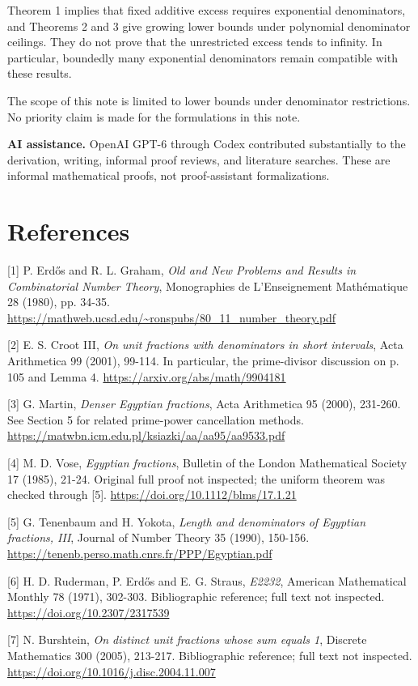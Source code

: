 \documentclass[11pt]{article}
\begin{document}
Theorem 1 implies that fixed additive excess requires exponential denominators, and Theorems 2 and 3 give growing lower bounds under polynomial denominator ceilings. They do not prove that the unrestricted excess tends to infinity. In particular, boundedly many exponential denominators remain compatible with these results.

The scope of this note is limited to lower bounds under denominator restrictions. No priority claim is made for the formulations in this note.

\textbf{AI assistance.} OpenAI GPT-6 through Codex contributed substantially to the derivation, writing, informal proof reviews, and literature searches. These are informal mathematical proofs, not proof-assistant formalizations.

\section*{References}\begingroup\small\setlength{\parskip}{4pt}

[1] P. Erd\H{o}s and R. L. Graham, \emph{Old and New Problems and Results in Combinatorial Number Theory}, Monographies de L'Enseignement Mathématique 28 (1980), pp. 34-35. \url{https://mathweb.ucsd.edu/~ronspubs/80_11_number_theory.pdf}

[2] E. S. Croot III, \emph{On unit fractions with denominators in short intervals}, Acta Arithmetica 99 (2001), 99-114. In particular, the prime-divisor discussion on p. 105 and Lemma 4. \url{https://arxiv.org/abs/math/9904181}

[3] G. Martin, \emph{Denser Egyptian fractions}, Acta Arithmetica 95 (2000), 231-260. See Section 5 for related prime-power cancellation methods. \url{https://matwbn.icm.edu.pl/ksiazki/aa/aa95/aa9533.pdf}

[4] M. D. Vose, \emph{Egyptian fractions}, Bulletin of the London Mathematical Society 17 (1985), 21-24. Original full proof not inspected; the uniform theorem was checked through [5]. \url{https://doi.org/10.1112/blms/17.1.21}

[5] G. Tenenbaum and H. Yokota, \emph{Length and denominators of Egyptian fractions, III}, Journal of Number Theory 35 (1990), 150-156. \url{https://tenenb.perso.math.cnrs.fr/PPP/Egyptian.pdf}

[6] H. D. Ruderman, P. Erd\H{o}s and E. G. Straus, \emph{E2232}, American Mathematical Monthly 78 (1971), 302-303. Bibliographic reference; full text not inspected. \url{https://doi.org/10.2307/2317539}

[7] N. Burshtein, \emph{On distinct unit fractions whose sum equals 1}, Discrete Mathematics 300 (2005), 213-217. Bibliographic reference; full text not inspected. \url{https://doi.org/10.1016/j.disc.2004.11.007}
\endgroup
\end{document}
